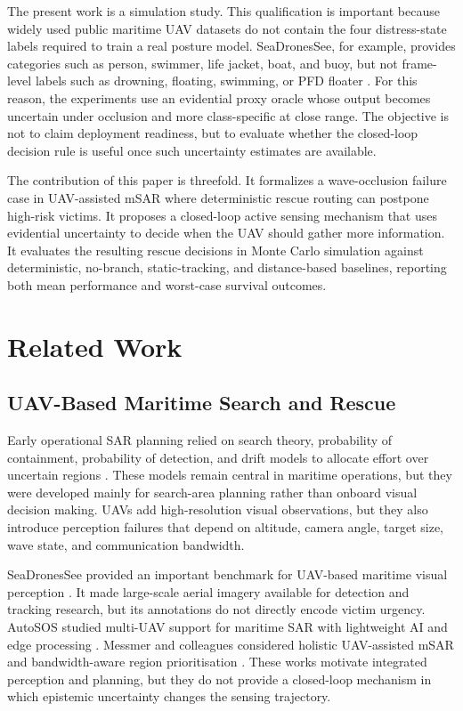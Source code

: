 \documentclass[runningheads]{llncs}
\begin{document}
The present work is a simulation study. This qualification is important because widely used public maritime UAV datasets do not contain the four distress-state labels required to train a real posture model. SeaDronesSee, for example, provides categories such as person, swimmer, life jacket, boat, and buoy, but not frame-level labels such as drowning, floating, swimming, or PFD floater \cite{varga2022seadronessee}. For this reason, the experiments use an evidential proxy oracle whose output becomes uncertain under occlusion and more class-specific at close range. The objective is not to claim deployment readiness, but to evaluate whether the closed-loop decision rule is useful once such uncertainty estimates are available.

The contribution of this paper is threefold. It formalizes a wave-occlusion failure case in UAV-assisted mSAR where deterministic rescue routing can postpone high-risk victims. It proposes a closed-loop active sensing mechanism that uses evidential uncertainty to decide when the UAV should gather more information. It evaluates the resulting rescue decisions in Monte Carlo simulation against deterministic, no-branch, static-tracking, and distance-based baselines, reporting both mean performance and worst-case survival outcomes.

\section{Related Work}

\subsection{UAV-Based Maritime Search and Rescue}

Early operational SAR planning relied on search theory, probability of containment, probability of detection, and drift models to allocate effort over uncertain regions \cite{koopman1980search,stone2016optimal,breivik2008sar}. These models remain central in maritime operations, but they were developed mainly for search-area planning rather than onboard visual decision making. UAVs add high-resolution visual observations, but they also introduce perception failures that depend on altitude, camera angle, target size, wave state, and communication bandwidth.

SeaDronesSee provided an important benchmark for UAV-based maritime visual perception \cite{varga2022seadronessee}. It made large-scale aerial imagery available for detection and tracking research, but its annotations do not directly encode victim urgency. AutoSOS studied multi-UAV support for maritime SAR with lightweight AI and edge processing \cite{queralta2020}. Messmer and colleagues considered holistic UAV-assisted mSAR and bandwidth-aware region prioritisation \cite{messmer2024holistic}. These works motivate integrated perception and planning, but they do not provide a closed-loop mechanism in which epistemic uncertainty changes the sensing trajectory.
\end{document}
